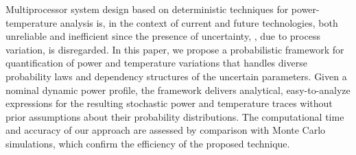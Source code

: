 Multiprocessor system design based on deterministic techniques for power-temperature analysis is, in the context of current and future technologies, both unreliable and inefficient since the presence of uncertainty, \eg, due to process variation, is disregarded. In this paper, we propose a probabilistic framework for quantification of power and temperature variations that handles diverse probability laws and dependency structures of the uncertain parameters. Given a nominal dynamic power profile, the framework delivers analytical, easy-to-analyze expressions for the resulting stochastic power and temperature traces without prior assumptions about their probability distributions. The computational time and accuracy of our approach are assessed by comparison with Monte Carlo simulations, which confirm the efficiency of the proposed technique.
